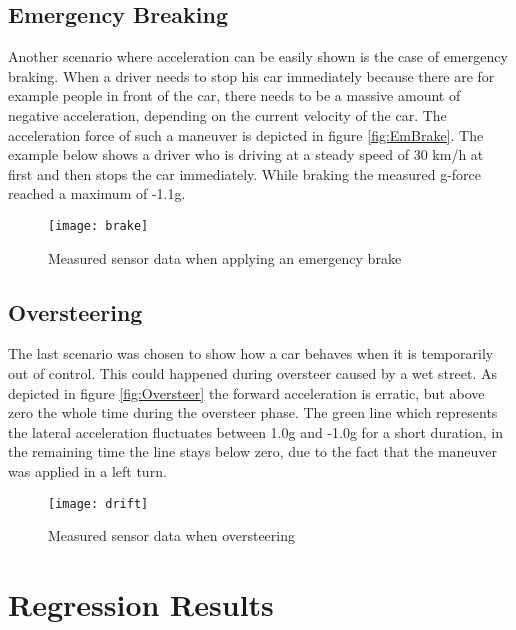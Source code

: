 \subsection{Emergency Breaking}
Another scenario where acceleration can be easily shown is the case of emergency braking. When a driver needs to stop his car immediately because there are for example people in front of the car, there needs to be a massive amount of negative acceleration, depending on the current velocity of the car. The acceleration force of such a maneuver is depicted in figure \vref{fig:EmBrake}. The example below shows a driver who is driving at a steady speed of 30 km/h at first and then stops the car immediately. While braking the measured g-force reached a maximum of -1.1g.

\begin{figure}[H]
    \centering
    \texttt{[image: brake]}
    \caption{Measured sensor data when applying an emergency brake}
    \label{fig:EmBrake}
\end{figure}

\subsection{Oversteering}

The last scenario was chosen to show how a car behaves when it is temporarily out of control. This could happened during oversteer caused by a wet street. As depicted in figure \vref{fig:Oversteer} the forward acceleration is erratic, but above zero the whole time during the oversteer phase. The green line which represents the lateral acceleration fluctuates between 1.0g and -1.0g for a short duration, in the remaining time the line stays below zero, due to the fact that the maneuver was applied in a left turn.

\begin{figure}[H]
    \centering
    \texttt{[image: drift]}
    \caption{Measured sensor data when oversteering}
    \label{fig:Oversteer}
\end{figure}

\section{Regression Results}


